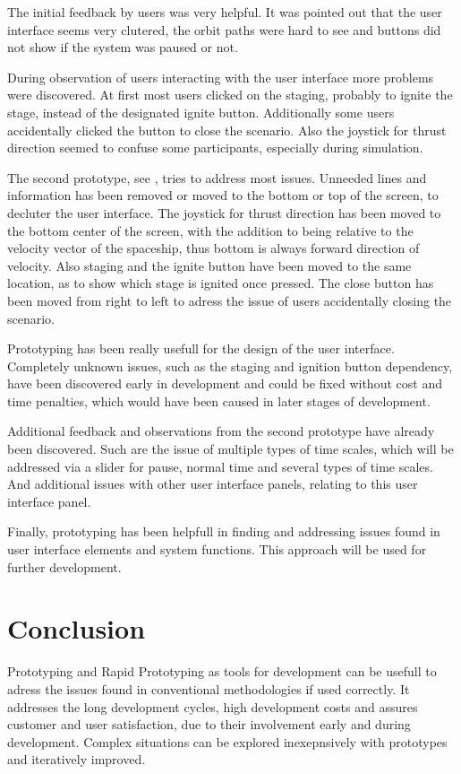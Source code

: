 \documentclass[runningheads]{llncs}
\begin{document}
The initial feedback by users was very helpful. It was pointed out that the user interface seems very clutered, the orbit paths 
were hard to see and buttons did not show if the system was paused or not.

During observation of users interacting with the user interface more problems were discovered. At first most users clicked on the
staging, probably to ignite the stage, instead of the designated ignite button. Additionally some users accidentally clicked the
button to close the scenario. Also the joystick for thrust direction seemed to confuse some participants, especially during simulation.

The second prototype, see , tries to address most issues. Unneeded lines and information has been removed or moved to the bottom 
or top of the screen, to decluter the user interface. The joystick for thrust direction has been moved to the bottom center of the screen, with 
the addition to being relative to the velocity vector of the spaceship, thus bottom is always forward direction of velocity. Also staging and the 
ignite button have been moved to the same location, as to show which stage is ignited once pressed. The close button has been moved from right
to left to adress the issue of users accidentally closing the scenario.

Prototyping has been really usefull for the design of the user interface. Completely unknown issues, such as the staging and ignition button dependency,
have been discovered early in development and could be fixed without cost and time penalties, which would have been caused in later stages of development.

Additional feedback and observations from the second prototype have already been discovered. Such are the issue of multiple types of time scales, which
will be addressed via a slider for pause, normal time and several types of time scales. And additional issues with other user interface panels, relating
to this user interface panel.

Finally, prototyping has been helpfull in finding and addressing issues found in user interface elements and system functions. This approach
will be used for further development.

\section{Conclusion}
Prototyping and Rapid Prototyping as tools for development can be usefull to adress the issues found in conventional methodologies if used correctly. 
It addresses the long development cycles, high development costs and assures customer and user satisfaction, due to their involvement
early and during development. Complex situations can be explored inexepnsively with prototypes and iteratively improved.
\end{document}
